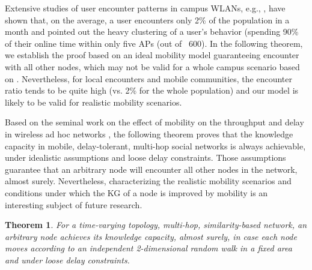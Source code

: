 \documentclass[conference]{IEEEtran}
\newtheorem{theorem}{Theorem}
\theoremstyle{definition}
\begin{document}
Extensive studies of user encounter patterns in campus WLANs, e.g., \cite{hsu,diot}, have shown that, on the average, a user encounters only 2\% of the population in a month and pointed out the heavy clustering of a user's behavior (spending 90\% of their online time within only five APs (out of ~600). In the following theorem, we establish the proof based on an ideal mobility model guaranteeing encounter with all other nodes, which may not be valid
for a whole campus scenario based on \cite{hsu}. Nevertheless, for local encounters and mobile communities, the encounter ratio tends to be quite high (vs. 2\% for the whole population) 
and our model is likely to be valid for realistic mobility scenarios.

Based on the seminal work on the effect of mobility on the throughput and delay in wireless ad hoc networks \cite{elgamal}, the following theorem proves that the knowledge capacity in mobile, delay-tolerant, multi-hop social networks is always achievable, under idealistic assumptions and loose delay constraints. Those assumptions guarantee that an arbitrary node will encounter all other nodes in the network, almost surely.
Nevertheless, characterizing the realistic mobility scenarios and conditions under which the KG of a node is improved by mobility is an interesting subject of future research.
%
%
\vspace{-0.2 cm}
\begin{theorem}
For a time-varying topology, multi-hop, similarity-based network, an arbitrary node achieves its knowledge capacity, almost surely, in case each 
node moves according to an independent 2-dimensional random walk in a fixed 
area and under loose delay constraints.
\end{theorem}
\vspace{-0.5 cm}
\end{document}
